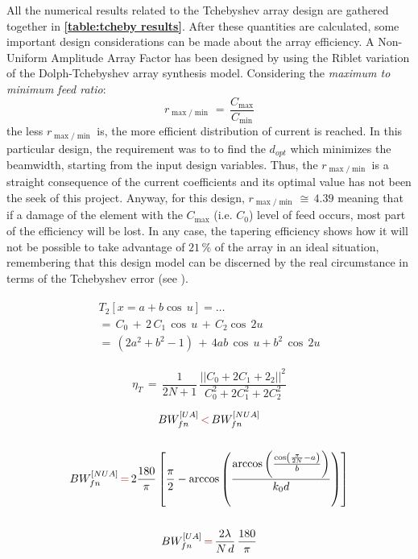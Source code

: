 \documentclass[10 pt,a4paper,twocolumn]{article}
\begin{document}
{\indent 

All the numerical results related to the Tchebyshev array design are gathered together in \textbf{\cref{table:tcheby results}}. After these quantities are calculated, some important design considerations can be made about the array efficiency. A Non-Uniform Amplitude Array Factor has been designed by using the Riblet variation of the Dolph-Tchebyshev array synthesis model. Considering the \emph{maximum to minimum feed ratio}: \[r_{\max/\min}\,=\,\frac{C_{\max}}{C_{\min}}\] 
the less $r_{\max/\min}$ is, the more efficient distribution of current is reached. In this particular design, the requirement was to to find the $d_{opt}$ which minimizes the beamwidth, starting from the input design variables. Thus, the $r_{\max/\min}$ is a straight consequence of the current coefficients and its optimal value has not been the seek of this project. Anyway, for this design, $r_{\max/\min}\,\cong\,4.39$ meaning that if a damage of the element with the $C_{\max}$ (i.e. $C_0$) level of feed occurs, most part of the efficiency will be lost. In any case, the tapering efficiency shows how it will not be possible to take advantage of $21\,\%$ of the array in an ideal situation, remembering that this design model can be discerned by the real circumstance in terms of the Tchebyshev error (see \textbf{\cite{Balanis1}}). 

\begin{equation}\begin{split}
		\begin{aligned}
			T_2\left[x=a+b\cos\,u\right]=\dots\\
			=\,C_0\,+\,2\,C_1\,\cos\,u\,+\,C_2\cos\,2u\\
			=\,(2a^2+b^2-1)\,+\,4ab\,\cos\,u+b^2\,\cos\,2u
			\label{eq:tcheby poly coeff}
		\end{aligned}
	\end{split}
\end{equation}

\begin{equation}
	\eta_T\,=\,\frac{1}{2N+1}\,\frac{||C_0+2C_1+2_2||^2}{C_0^2+2C_1^2+2C_2^2}
	\label{eq:tapering efficiency}
\end{equation}

\begin{equation}
	\begin{gathered}
		BW_{fn}^{[UA]}\,{\color{Mahogany}<}\,BW_{fn}^{[NUA]}\\
		\\
		BW_{fn}^{[NUA]}\,{\color{Mahogany}=}\,2\frac{180}{\pi}\left[\frac{\pi}{2}-\arccos\left(\frac{\arccos\left(\frac{\cos\left(\frac{\pi}{2N}-a\right)}{b}\right)}{k_0d}\right)\right]\\
		\\
		BW_{fn}^{[UA]}\,{\color{Mahogany}=}\,\frac{2\lambda}{N\,d}\,\frac{180}{\pi}
	\end{gathered}
	\label{eq:tcheby beamwidth}
\end{equation}

}
\end{document}
